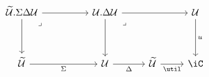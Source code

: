 \[\begin{tikzcd}
	{\Tm.\Sigma\Delta\Ty} && {\Ty.\Delta\Ty} && \Ty \\
	\\
	\Tm && \Ty & \Tm & \iC
	\arrow["\Delta"', from=3-3, to=3-4]
	\arrow["\util"', from=3-4, to=3-5]
	\arrow["u", from=1-5, to=3-5]
	\arrow[from=1-3, to=3-3]
	\arrow[from=1-3, to=1-5]
	\arrow["\lrcorner"{anchor=center, pos=0.125}, draw=none, from=1-3, to=3-5]
	\arrow["\Sigma"', from=3-1, to=3-3]
	\arrow[from=1-1, to=3-1]
	\arrow[from=1-1, to=1-3]
	\arrow["\lrcorner"{anchor=center, pos=0.125}, draw=none, from=1-1, to=3-3]
\end{tikzcd}\]